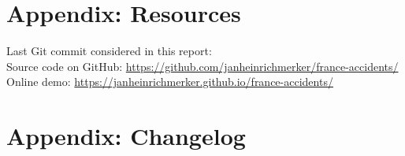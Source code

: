 \section*{Appendix: Resources}
Last Git commit considered in this report: \href{https://github.com/janheinrichmerker/france-accidents/commits/}{\texttt{\lastcommit}} \\
Source code on GitHub: \url{https://github.com/janheinrichmerker/france-accidents/} \\
Online demo: \url{https://janheinrichmerker.github.io/france-accidents/}

\section*{Appendix: Changelog}

